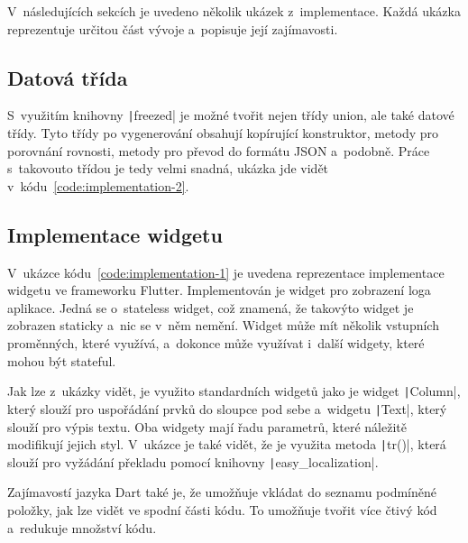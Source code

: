 V~následujících sekcích je uvedeno několik ukázek z~implementace.
Každá ukázka reprezentuje určitou část vývoje a~popisuje její zajímavosti.

\subsection{Datová třída}

S~využitím knihovny \texttt|freezed| je možné tvořit nejen
třídy union,
ale také datové třídy.
Tyto třídy po vygenerování obsahují kopírující konstruktor,
metody pro porovnání rovnosti,
metody pro převod do formátu JSON a~podobně.
Práce s~takovouto třídou je tedy velmi snadná,
ukázka jde vidět v~kódu~\ref{code:implementation-2}.

\subsection{Implementace widgetu}

V~ukázce kódu~\ref{code:implementation-1} je uvedena reprezentace implementace widgetu
ve frameworku Flutter.
Implementován je widget pro zobrazení loga aplikace.
Jedná se o~stateless widget,
což znamená,
že takovýto widget je zobrazen staticky a~nic se v~něm nemění.
Widget může mít několik vstupních proměnných,
které využívá,
a~dokonce může využívat i~další widgety,
které mohou být stateful.

Jak lze z~ukázky vidět,
je využito standardních widgetů jako je widget \texttt|Column|,
který slouží pro uspořádání prvků do sloupce pod sebe
a~widgetu \texttt|Text|,
který slouží pro výpis textu.
Oba widgety mají řadu parametrů,
které náležitě modifikují jejich styl.
V~ukázce je také vidět,
že je využita metoda \texttt|tr()|,
která slouží pro vyžádání překladu pomocí knihovny \texttt|easy_localization|.

Zajímavostí jazyka Dart také je,
že umožňuje vkládat do seznamu podmíněné položky,
jak lze vidět ve spodní části kódu.
To umožňuje tvořit více čtivý kód a~redukuje množství kódu.

